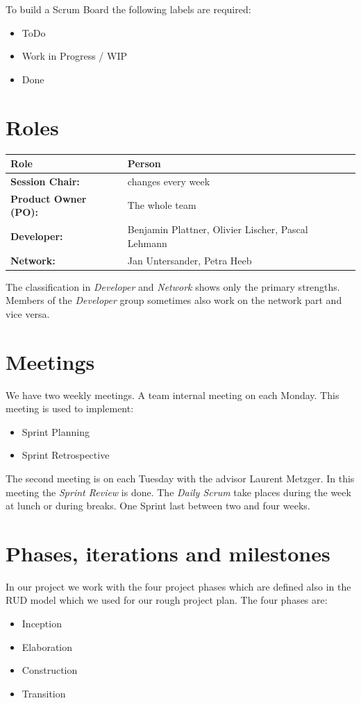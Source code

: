To build a Scrum Board the following labels are required:

\begin{itemize}
\item ToDo
\item Work in Progress / WIP
\item Done
\end{itemize}

\section{Roles}
\label{roles}

\begin{tabular}{|l|l|}
    \textbf{Role} & \textbf{Person}\\
    \hline
    \textbf{Session Chair:} & changes every week \\
    \textbf{Product Owner (PO):} & The whole team \\
    \textbf{Developer:} & Benjamin Plattner, Olivier Lischer, Pascal Lehmann\\
    \textbf{Network:} & Jan Untersander, Petra Heeb \\
\end{tabular}
\newline
\noindent The classification in \textsl{Developer} and \textsl{Network} shows only the primary strengths.
Members of the \textsl{Developer} group sometimes also work on the network part and vice versa.


\section{Meetings}
\label{meetings}
We have two weekly meetings.
A team internal meeting on each Monday.
This meeting is used to implement:
\begin{itemize}
  \item Sprint Planning
  \item Sprint Retrospective 
\end{itemize}

\noindent The second meeting is on each Tuesday with the advisor Laurent Metzger.
In this meeting the \textsl{Sprint Review} is done.
The \textsl{Daily Scrum} take places during the week at lunch or during breaks.
One Sprint last between two and four weeks.


\section{Phases, iterations and milestones}
\label{phases}
In our project we work with the four project phases which are defined also in the RUD model which we used for our rough project plan. The four phases are:
\begin{itemize}
    \item Inception
    \item Elaboration
    \item Construction
    \item Transition
\end{itemize}

